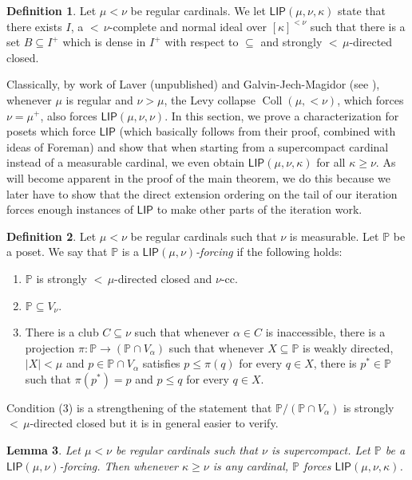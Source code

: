 \documentclass[a4paper]{amsart}
\theoremstyle{definition}
\newtheorem{mydef}{Definition}[section]
\theoremstyle{remark}
\theoremstyle{plain}
\newtheorem{mylem}[mydef]{Lemma}
\numberwithin{mydef}{section}
\DeclareMathOperator{\Coll}{Coll}
\newcommand{\dP}{\mathbb{P}}
\newcommand{\LIP}{\mathsf{LIP}}
\begin{document}
	\begin{mydef}
		Let $\mu<\nu$ be regular cardinals. We let $\LIP(\mu,\nu,\kappa)$ state that there exists $I$, a ${<}\,\nu$-complete and normal ideal over $[\kappa]^{<\nu}$ such that there is a set $B\subseteq I^+$ which is dense in $I^+$ with respect to $\subseteq$ and strongly ${<}\,\mu$-directed closed.
	\end{mydef}
	
	Classically, by work of Laver (unpublished) and Galvin-Jech-Magidor (see \cite[Theorem 2]{GalvinJechMagidorIdealGame}), whenever $\mu$ is regular and $\nu>\mu$, the Levy collapse $\Coll(\mu,<\nu)$, which forces $\nu=\mu^+$, also forces $\LIP(\mu,\nu,\nu)$. In this section, we prove a characterization for posets which force $\LIP$ (which basically follows from their proof, combined with ideas of Foreman) and show that when starting from a supercompact cardinal instead of a measurable cardinal, we even obtain $\LIP(\mu,\nu,\kappa)$ for all $\kappa\geq\nu$. As will become apparent in the proof of the main theorem, we do this because we later have to show that the direct extension ordering on the tail of our iteration forces enough instances of $\LIP$ to make other parts of the iteration work.
	
	\begin{mydef}\label{LIPForcingDef}
		Let $\mu<\nu$ be regular cardinals such that $\nu$ is measurable. Let $\dP$ be a poset. We say that $\dP$ is a \emph{$\LIP(\mu,\nu)$-forcing} if the following holds:
		\begin{enumerate}
			\item $\dP$ is strongly ${<}\,\mu$-directed closed and $\nu$-cc.
			\item $\dP\subseteq V_{\nu}$.
			\item There is a club $C\subseteq\nu$ such that whenever $\alpha\in C$ is inaccessible, there is a projection $\pi\colon\dP\to(\dP\cap V_{\alpha})$ such that whenever $X\subseteq\dP$ is weakly directed, $|X|<\mu$ and $p\in\dP\cap V_{\alpha}$ satisfies $p\leq\pi(q)$ for every $q\in X$, there is $p^*\in\dP$ such that $\pi(p^*)=p$ and $p\leq q$ for every $q\in X$.
		\end{enumerate}
	\end{mydef}
	
	Condition (3) is a strengthening of the statement that $\dP/(\dP\cap V_{\alpha})$ is strongly ${<}\,\mu$-directed closed but it is in general easier to verify.
	
	\begin{mylem}\label{LIPForcingLemma}
		Let $\mu<\nu$ be regular cardinals such that $\nu$ is supercompact. Let $\dP$ be a $\LIP(\mu,\nu)$-forcing. Then whenever $\kappa\geq\nu$ is any cardinal, $\dP$ forces $\LIP(\mu,\nu,\kappa)$.
	\end{mylem}
	
\end{document}
